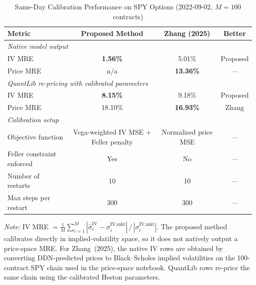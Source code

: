 \begin{table}[htbp]
  \centering
  \caption{Same-Day Calibration Performance on SPY Options (2022-09-02, $M=100$ contracts)}
  \label{tab:spy_sameday}
  \setlength{\tabcolsep}{7pt}
  \begin{tabular}{lccc}
    \toprule
    \textbf{Metric} & \textbf{Proposed Method} & \textbf{Zhang (2025)} & \textbf{Better} \\
    \midrule
    \multicolumn{4}{l}{\textit{Native model output}} \\
    \quad IV MRE & \textbf{1.56\%} & 5.01\% & Proposed \\
    \quad Price MRE & n/a & \textbf{13.36\%} & --- \\
    \midrule
    \multicolumn{4}{l}{\textit{QuantLib re-pricing with calibrated parameters}} \\
    \quad IV MRE & \textbf{8.15\%} & 9.18\% & Proposed \\
    \quad Price MRE & 18.10\% & \textbf{16.93\%} & Zhang \\
    \midrule
    \multicolumn{4}{l}{\textit{Calibration setup}} \\
    \quad Objective function & Vega-weighted IV MSE + Feller penalty & Normalised price MSE & --- \\
    \quad Feller constraint enforced & Yes & No & --- \\
    \quad Number of restarts & 10 & 10 & --- \\
    \quad Max steps per restart & 300 & 300 & --- \\
    \bottomrule
  \end{tabular}
  \begin{tablenotes}
    \small
    \item \textit{Note:} IV MRE $= \frac{1}{M}\sum_{i=1}^{M} |\hat{\sigma}^{\text{IV}}_i - \sigma^{\text{IV},\text{mkt}}_i|\,/\,|\sigma^{\text{IV},\text{mkt}}_i|$. The proposed method calibrates directly in implied-volatility space, so it does not natively output a price-space MRE. For Zhang~(2025), the native IV rows are obtained by converting DDN-predicted prices to Black--Scholes implied volatilities on the 100-contract SPY chain used in the price-space notebook. QuantLib rows re-price the same chain using the calibrated Heston parameters.
  \end{tablenotes}
\end{table}


